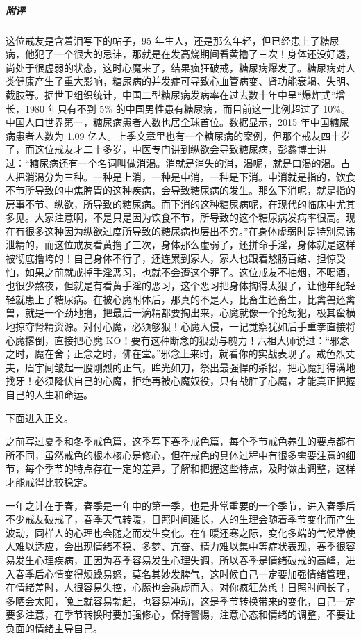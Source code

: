 \begin{case}
    \subparagraph{附评} 这位戒友是含着泪写下的帖子，95 年生人，还是那么年轻，但已经患上了糖尿病，他犯了一个很大的忌讳，那就是在发高烧期间看黄撸了三次！身体还没好透，尚处于很虚弱的状态，这时心魔来了，结果疯狂破戒，糖尿病爆发了。糖尿病对人类健康产生了重大影响，糖尿病的并发症可导致心血管病变、肾功能衰竭、失明、截肢等。据世卫组织统计，中国二型糖尿病发病率在过去数十年中呈“爆炸式”增长，1980 年只有不到 5\% 的中国男性患有糖尿病，而目前这一比例超过了 10\%。中国人口世界第一，糖尿病患者人数也居全球首位。数据显示，2015 年中国糖尿病患者人数为 1.09 亿人。上季文章里也有一个糖尿病的案例，但那个戒友四十岁了，而这位戒友才二十多岁，中医专门讲到纵欲会导致糖尿病，彭鑫博士讲过：“糖尿病还有一个名词叫做消渴。消就是消失的消，渴呢，就是口渴的渴。古人把消渴分为三种。一种是上消，一种是中消，一种是下消。中消就是指的，饮食不节所导致的中焦脾胃的这种疾病，会导致糖尿病的发生。那么下消呢，就是指的房事不节、纵欲，所导致的糖尿病。而下消的这种糖尿病呢，在现代的临床中尤其多见。大家注意啊，不是只是因为饮食不节，所导致的这个糖尿病发病率很高。现在有很多这种因为纵欲过度所导致的糖尿病也层出不穷。”在身体虚弱时是特别忌讳泄精的，而这位戒友看黄撸了三次，身体那么虚弱了，还拼命手淫，身体就是这样被彻底撸垮的！自己身体不行了，还连累到家人，家人也跟着愁肠百结、担惊受怕，如果之前就戒掉手淫恶习，也就不会遭这个罪了。这位戒友不抽烟，不喝酒，也很少熬夜，但就是有看黄手淫的恶习，这个恶习把身体掏得太狠了，让他年纪轻轻就患上了糖尿病。在被心魔附体后，那真的不是人，比畜生还畜生，比禽兽还禽兽，就是一个劲地撸，把最后一滴精都要掏出来，心魔就像一个抢劫犯，极其蛮横地掠夺肾精资源。对付心魔，必须够狠！心魔入侵，一记觉察犹如后手重拳直接将心魔撂倒，直接把心魔 KO！要有这种断念的狠劲与魄力！六祖大师说过：“邪念之时，魔在舍；正念之时，佛在堂。”邪念上来时，就看你的实战表现了。戒色烈丈夫，眉宇间皱起一股刚烈的正气，眸光如刀，祭出最强悍的杀招，把心魔打得满地找牙！必须降伏自己的心魔，拒绝再被心魔奴役，只有战胜了心魔，才能真正把握自己的人生和命运。
\end{case}

下面进入正文。

之前写过夏季和冬季戒色篇，这季写下春季戒色篇，每个季节戒色养生的要点都有所不同，虽然戒色的根本核心是修心，但在戒色的具体过程中有很多需要注意的细节，每个季节的特点存在一定的差异，了解和把握这些特点，及时做出调整，这样才能戒得比较稳定。

一年之计在于春，春季是一年中的第一季，也是非常重要的一个季节，进入春季后不少戒友破戒了，春季天气转暖，日照时间延长，人的生理会随着季节变化而产生波动，同样人的心理也会随之而发生变化。在乍暖还寒之际，变化多端的气候常使人难以适应，会出现情绪不稳、多梦、亢奋、精力难以集中等症状表现，春季很容易发生心理疾病，正因为春季容易发生心理失调，所以春季是情绪破戒的高峰，进入春季后心情变得烦躁易怒，莫名其妙发脾气，这时候自己一定要加强情绪管理，在情绪差时，人很容易失控，心魔也会乘虚而入，对你疯狂怂恿！日照时间长了，多晒会太阳，晚上就容易勃起，也容易冲动，这是季节转换带来的变化，自己一定要多注意，在季节转换时要加强修心，保持警惕，注意心态和情绪的调整，不要让负面的情绪主导自己。

